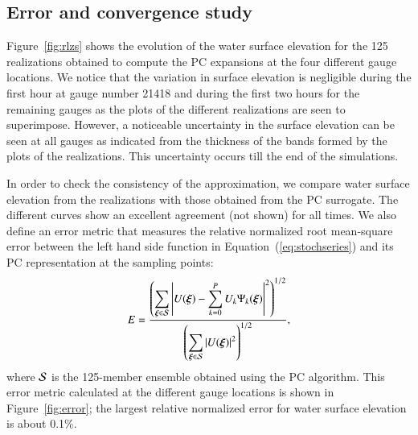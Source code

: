 \subsection{Error and convergence study}
\label{sec:analysis}

Figure~\ref{fig:rlzs} shows the evolution of the
water surface elevation for the 125 realizations obtained 
to compute the PC expansions at the four different gauge 
locations. We notice that the variation in surface elevation 
is negligible during the first hour at gauge number 21418 
and during the first two hours for the remaining gauges
as the plots of the different realizations are seen to superimpose.
However, a noticeable uncertainty in the surface 
elevation can be seen  at all gauges as indicated from the thickness 
of the bands formed by the plots of the realizations. This uncertainty
occurs till the end of the simulations.

In order to check the consistency of the approximation, we compare
 water surface elevation from the realizations 
with those obtained from the PC surrogate. The different curves
show an excellent agreement (not shown) for all times. We also define
an error metric that measures the relative normalized root mean-square error between the left hand side function 
in Equation~(\ref{eq:stochseries})
and its PC representation at the sampling points:
\begin{equation} 
   E = \frac{\displaystyle
         \left(\sum_{\xxi \in \NISP} \left|U(\xxi) - \sum_{k = 0}^{P}
U_k\Psi_k(\xxi)\right|^2
         \right)^{1/2}}
        {\displaystyle
          \left(\sum_{\xxi \in \NISP} \left|U(\xxi)\right|^2\right)^{1/2} 
          },
\label{eq:error}
\end{equation}
where $\mathcal{S}$ is the 125-member ensemble obtained using the PC algorithm. 
This error metric calculated at the different gauge locations is shown in Figure~\ref{fig:error};
the largest relative normalized error for 
water surface elevation is about 0.1\%. 



